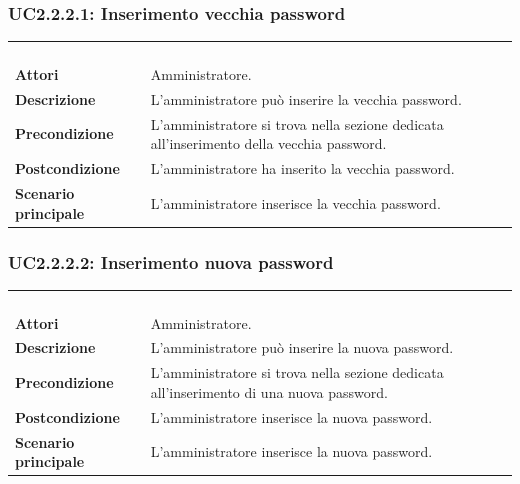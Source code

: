 \subsubsection{UC2.2.2.1: Inserimento vecchia password}
\label{UC2.2.2.1}
\begin{longtable}{l|p{10cm}}
\rowcolor[gray]{0.8} \multicolumn{2}{c}{} \\
\rowcolor[gray]{0.8} \multicolumn{2}{c}{\textbf{UC2.2.2.1 - Inserimento vecchia password}} \\
\rowcolor[gray]{0.8} \multicolumn{2}{c}{} \\
\hline
&\\
\textbf{Attori} & Amministratore.\\[7pt]
\textbf{Descrizione} & L'amministratore può inserire la vecchia password.\\[7pt]
\textbf{Precondizione} & L'amministratore si trova nella sezione dedicata all'inserimento della vecchia password.\\[7pt]
\textbf{Postcondizione} & L'amministratore ha inserito la vecchia password.\\[7pt]
\textbf{Scenario principale} &L'amministratore inserisce la vecchia password.\\[7pt]\hline
\end{longtable}

\subsubsection{UC2.2.2.2: Inserimento nuova password}
\label{UC2.2.2.2}
\begin{longtable}{l|p{10cm}}
\rowcolor[gray]{0.8} \multicolumn{2}{c}{} \\
\rowcolor[gray]{0.8} \multicolumn{2}{c}{\textbf{UC2.2.2.2 - Inserimento nuova password}} \\
\rowcolor[gray]{0.8} \multicolumn{2}{c}{} \\
\hline
&\\
\textbf{Attori} & Amministratore.\\[7pt]
\textbf{Descrizione} & L'amministratore può inserire la nuova password.\\[7pt]
\textbf{Precondizione} & L'amministratore si trova nella sezione dedicata all'inserimento di una nuova password.\\[7pt]
\textbf{Postcondizione} & L'amministratore inserisce la nuova password.\\[7pt]
\textbf{Scenario principale} &L'amministratore inserisce la nuova password.\\[7pt]\hline
\end{longtable}

